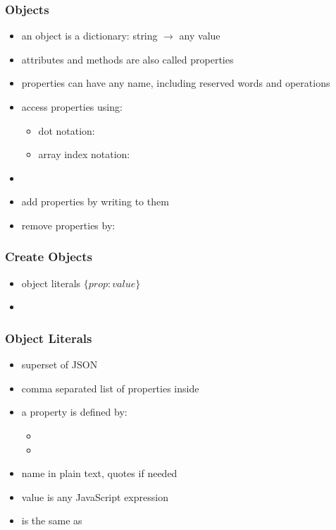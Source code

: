 \begin{frame}[fragile] \frametitle{Objects}
\begin{itemize}
  \item an object is a dictionary: string $\rightarrow$ any value
  \item attributes and methods are also called properties
  \item properties can have any name, including reserved words and operations
  \item access properties using:
  \begin{itemize}
    \item dot notation: 
    \item array index notation: 
  \end{itemize}
  \item {}
  \item add properties by writing to them 
  \item remove properties by: 
\end{itemize}
\end{frame}

\begin{frame}[fragile] \frametitle{Create Objects}
\begin{itemize}
  \item object literals $\{prop: value\}$
  \item {}
\end{itemize}
\end{frame}

\begin{frame}[fragile] \frametitle{Object Literals}
\begin{itemize}
  \item superset of JSON
  \item comma separated list of properties inside \code{\{ \}}
  \item a property is defined by:
  \begin{itemize}
    \item {}
    \item {}
  \end{itemize}
  \item name in plain text, quotes if needed 
  \item value is any JavaScript expression
  \item {} is the same as 
\end{itemize}
\end{frame}

